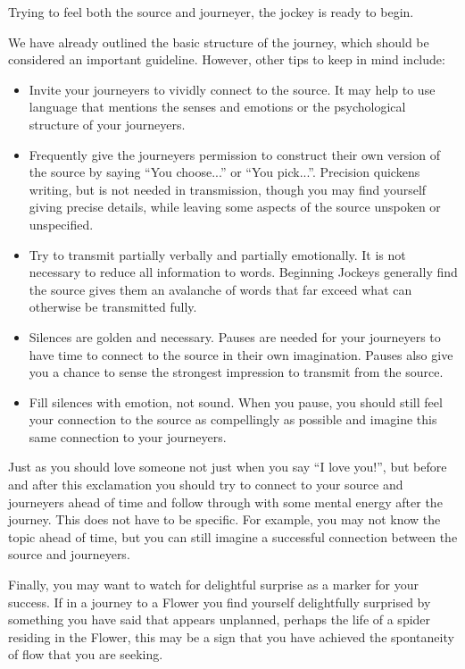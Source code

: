 \documentclass[12pt]{book}
\begin{document}
Trying to feel both the source and journeyer, the jockey is ready to begin.
					
We have already outlined the basic structure of the journey, which should be considered an important guideline. However, other tips to keep in mind include:
					

	\begin{itemize}
\item 
  Invite your journeyers to vividly connect to the source. It may help to use language that mentions the senses and emotions or the psychological structure of your journeyers.
\item 		
  Frequently give the journeyers permission to construct their own version of the source by saying ``You choose...'' or ``You pick...''.
  Precision quickens writing, but is not needed in transmission, though you may find yourself giving precise details, while leaving some aspects of the source unspoken or unspecified.
\item 		
  Try to transmit partially verbally and partially emotionally. It is not necessary to reduce all information to words. Beginning Jockeys  generally find the source gives them an avalanche of words that far exceed what can otherwise  be transmitted fully.
\item 		
Silences are golden and necessary. Pauses are needed for your journeyers to have time to connect to the source in their own imagination.
Pauses also give you a chance to sense the strongest impression to transmit from the source.
\item 
Fill silences with emotion, not sound. When you pause, you should still feel your connection to the source as compellingly as possible and imagine this same connection to your journeyers.
\end{itemize}
  
					
Just as you should love someone not just when you say ``I love you!'', but before and after this exclamation you should try to connect to your source and journeyers ahead of time and follow through with some mental energy after the journey. This does not have to be specific. For example, you may not know the topic ahead of time, but you can still imagine a successful connection between the source and journeyers.
					
Finally, you may want to watch for delightful surprise as a marker for your success. If in a journey to a Flower you find yourself delightfully surprised by something you have said that appears unplanned, perhaps the life of a spider residing in the Flower, this may be a sign that you have achieved the spontaneity of flow that you are seeking.
				
\end{document}

